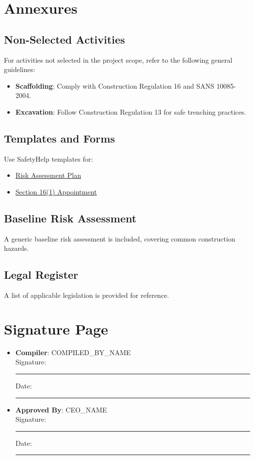 \documentclass[11pt]{article}
\newcommand{\compilerName}{{{COMPILED_BY_NAME}}}
\newcommand{\compilerName}{{{COMPILED_BY_NAME}}}
\begin{document}
\section{Annexures}
\subsection{Non-Selected Activities}
For activities not selected in the project scope, refer to the following general guidelines:
\begin{itemize}
  \item \textbf{Scaffolding}: Comply with Construction Regulation 16 and SANS 10085-2004.
  \item \textbf{Excavation}: Follow Construction Regulation 13 for safe trenching practices.
\end{itemize}

\subsection{Templates and Forms}
Use SafetyHelp templates for:
\begin{itemize}
  \item \href{https://safetyfirst.help/templates/ohs-system/risk-assessment-plan-template.tex}{Risk Assessment Plan}
  \item \href{https://safetyfirst.help/templates/ohs-system/section-16-1-appointment-template.tex}{Section 16(1) Appointment}
\end{itemize}

\subsection{Baseline Risk Assessment}
A generic baseline risk assessment is included, covering common construction hazards.

\subsection{Legal Register}
A list of applicable legislation is provided for reference.

\section{Signature Page}
\begin{itemize}
  \item \textbf{Compiler}: \compilerName \\
    Signature: \rule{5cm}{0.4pt} \quad Date: \rule{3cm}{0.4pt}
  \item \textbf{Approved By}: {{CEO_NAME}} \\
    Signature: \rule{5cm}{0.4pt} \quad Date: \rule{3cm}{0.4pt}
\end{itemize}
\end{document}
